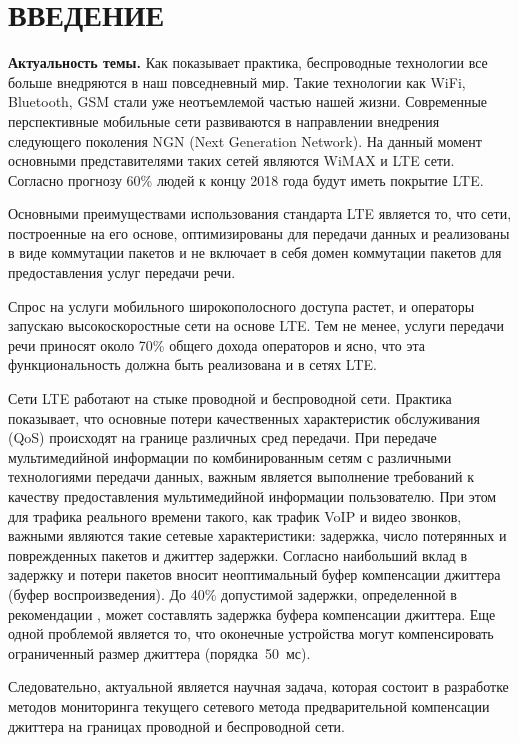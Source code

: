 \chapter*{ВВЕДЕНИЕ}							%

\textbf{Актуальность темы.} Как показывает практика, беспроводные технологии все больше внедряются в наш повседневный мир. Такие технологии как WiFi, Bluetooth, GSM стали уже неотъемлемой частью нашей жизни. 
Современные перспективные мобильные сети развиваются в направлении внедрения следующего поколения NGN (Next Generation Network). На данный момент основными представителями таких сетей являются WiMAX и LTE сети.
Согласно прогнозу \cite{ericsson} 60\% людей к концу 2018 года будут иметь покрытие LTE.


Основными преимуществами использования стандарта LTE является то, что сети, построенные на его основе, оптимизированы для передачи данных и реализованы в виде коммутации пакетов 
и не включает в себя домен коммутации пакетов для предоставления услуг передачи речи.

Спрос на услуги мобильного широкополосного доступа растет, и операторы запускаю высокоскоростные сети на основе LTE. 
Тем не менее, услуги передачи речи приносят около 70\% общего дохода операторов и ясно, что эта функциональность должна быть реализована и в сетях LTE.

Сети LTE работают на стыке проводной и беспроводной сети. %
Практика показывает, что основные потери качественных характеристик обслуживания (QoS) происходят на границе различных сред передачи.
При передаче мультимедийной информации по комбинированным сетям с различными технологиями передачи данных, важным является выполнение требований к качеству предоставления мультимедийной информации пользователю.
При этом для трафика реального времени такого, как трафик VoIP и видео звонков, важными являются такие сетевые характеристики:
задержка, число потерянных и поврежденных пакетов и джиттер задержки.
Согласно \cite{rokovoy} наибольший вклад в задержку и потери пакетов вносит неоптимальный буфер компенсации джиттера (буфер воспроизведения). До 40\% допустимой задержки, определенной в рекомендации \cite{G114}, может составлять задержка буфера компенсации джиттера.
Еще одной проблемой является то, что оконечные устройства могут компенсировать ограниченный размер джиттера (порядка~50~мс).

Следовательно, актуальной является научная задача, которая состоит в разработке методов мониторинга текущего сетевого метода предварительной компенсации джиттера на границах проводной и беспроводной сети.


